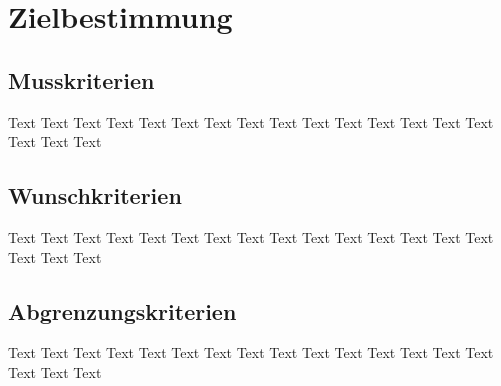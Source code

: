 \chapter{Zielbestimmung}
\section{Musskriterien}
Text Text Text Text Text Text Text Text Text Text Text Text Text Text Text Text Text Text
\section{Wunschkriterien}
Text Text Text Text Text Text Text Text Text Text Text Text Text Text Text Text Text Text
\section{Abgrenzungskriterien}
Text Text Text Text Text Text Text Text Text Text Text Text Text Text Text Text Text Text
